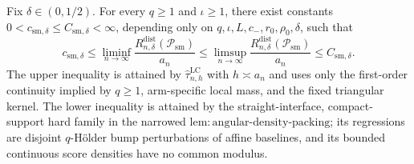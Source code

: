 Fix \(\delta\in(0,1/2)\). For every \(q\geq1\) and \(\iota\geq1\), there exist constants \(0<c_{\mathrm{sm},\delta}\leq C_{\mathrm{sm},\delta}<\infty\), depending only on \(q,\iota,L,c_{-},r_0,\rho_0,\delta\), such that \[c_{\mathrm{sm},\delta}\leq\liminf_{n\to\infty}\frac{R_{n,\delta}^{\mathrm{dist}}(\mathcal{P}_{\mathrm{sm}})}{a_n}\leq\limsup_{n\to\infty}\frac{R_{n,\delta}^{\mathrm{dist}}(\mathcal{P}_{\mathrm{sm}})}{a_n}\leq C_{\mathrm{sm},\delta}.\] The upper inequality is attained by \(\widehat{\tau}^{\mathrm{LC}}_{n,h}\) with \(h\asymp a_n\) and uses only the first-order continuity implied by \(q\geq1\), arm-specific local mass, and the fixed triangular kernel. The lower inequality is attained by the straight-interface, compact-support hard family in the narrowed \(\mathrm{lem:angular\text{-}density\text{-}packing}\); its regressions are disjoint \(q\)-H\"older bump perturbations of affine baselines, and its bounded continuous score densities have no common modulus.